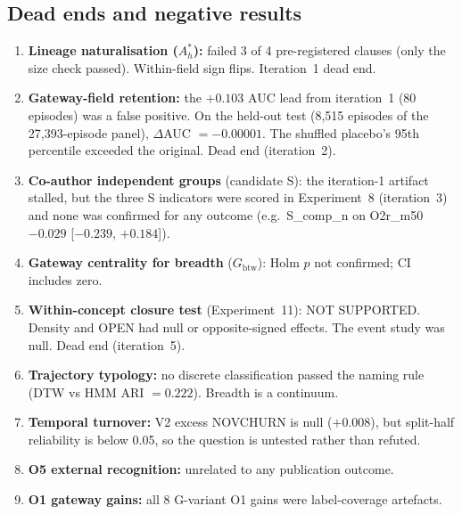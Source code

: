 \documentclass[11pt,letterpaper]{article}
\begin{document}
\subsection{Dead ends and negative results}

\begin{enumerate}
    \item \textbf{Lineage naturalisation ($A^*_h$):} failed 3 of 4 pre-registered clauses (only the size check passed). Within-field sign flips. Iteration~1 dead end.

    \item \textbf{Gateway-field retention:} the $+0.103$ AUC lead from iteration~1 (80 episodes) was a false positive. On the held-out test (8{,}515 episodes of the 27{,}393-episode panel), $\Delta$AUC $= -0.00001$. The shuffled placebo's 95th percentile exceeded the original. Dead end (iteration~2).

    \item \textbf{Co-author independent groups} (candidate S): the iteration-1 artifact stalled, but the three S indicators were scored in Experiment~8 (iteration~3) and none was confirmed for any outcome (e.g.\ S\_comp\_n on O2r\_m50 $-0.029$ [$-0.239$, $+0.184$]).

    \item \textbf{Gateway centrality for breadth} ($G_{\text{btw}}$): Holm $p$ not confirmed; CI includes zero.

    \item \textbf{Within-concept closure test} (Experiment~11): NOT SUPPORTED. Density and OPEN had null or opposite-signed effects. The event study was null. Dead end (iteration~5).

    \item \textbf{Trajectory typology:} no discrete classification passed the naming rule (DTW vs HMM ARI $= 0.222$). Breadth is a continuum.

    \item \textbf{Temporal turnover:} V2 excess NOVCHURN is null ($+0.008$), but split-half reliability is below 0.05, so the question is untested rather than refuted.

    \item \textbf{O5 external recognition:} unrelated to any publication outcome.

    \item \textbf{O1 gateway gains:} all 8 G-variant O1 gains were label-coverage artefacts.
\end{enumerate}
\end{document}
